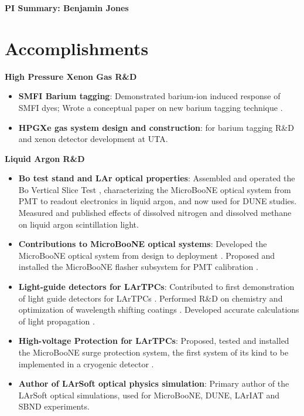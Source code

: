 
\begin{center}
\Large\textbf{PI Summary: Benjamin Jones}
\end{center}


\section*{\textbf{Accomplishments}}

\noindent\textbf{High Pressure Xenon Gas R\&D}

\begin{itemize}[noitemsep,nolistsep]
\item{\textbf{SMFI Barium tagging}}: Demonstrated  barium-ion induced response of SMFI dyes; Wrote a conceptual paper on new barium tagging technique \cite{Jones:2016qiq}.
\item{\textbf{HPGXe gas system design and construction}}: for barium tagging R\&D and xenon detector development at UTA.

\end{itemize}

\noindent\textbf{Liquid Argon R\&D}
\begin{itemize}[noitemsep,nolistsep]
\item{\textbf{Bo test stand and LAr optical properties}}:  Assembled and operated the Bo Vertical Slice Test \cite{Jones:2013nea}, characterizing the MicroBooNE optical system from PMT to readout electronics in liquid argon, and now  used for DUNE studies.  Measured and published effects of dissolved nitrogen \cite{Jones:2013bca} and dissolved methane \cite{Jones:2013mfa} on liquid argon scintillation light. 
\item{\textbf{Contributions to MicroBooNE optical systems}}: Developed the MicroBooNE optical system from design to deployment \cite{Briese:2013wua}. Proposed and installed the MicroBooNE flasher subsystem for PMT calibration \cite{Conrad:2015xta}.  
\item{\textbf{Light-guide detectors for LArTPCs}}: Contributed to first demonstration of light guide detectors for LArTPCs \cite{Moss:2014ota,Baptista:2012bf}.  Performed R\&D on chemistry and optimization of wavelength shifting coatings \cite{Chiu:2012ju,Jones:2012hm}.  Developed accurate calculations of light propagation \cite{Jones:2013sfa}.
\item{\textbf{High-voltage Protection for LArTPCs}}: Proposed, tested and installed the MicroBooNE surge protection system, the first system of its kind to be implemented in a cryogenic detector \cite{Asaadi:2014iva}.
\item{\textbf{Author of LArSoft optical physics simulation}}:  Primary author of the LArSoft optical simulations, used for MicroBooNE, DUNE, LArIAT and SBND experiments.

\end{itemize}

